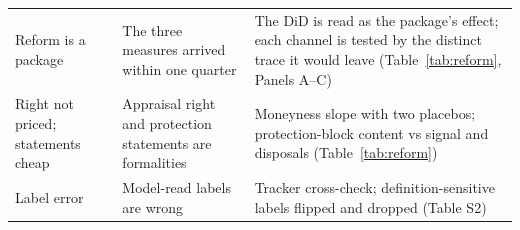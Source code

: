 \begin{table}[htbp]
{\begin{tabular}{>{\raggedright\arraybackslash}p{3.0cm}>{\raggedright\arraybackslash}p{5.4cm}>{\raggedright\arraybackslash}p{6.3cm}}
Reform is a package & The three measures arrived within one quarter & The DiD is read as the package's effect; each channel is tested by the distinct trace it would leave (Table~\ref{tab:reform}, Panels A--C) \\
Right not priced; statements cheap & Appraisal right and protection statements are formalities & Moneyness slope with two placebos; protection-block content vs signal and disposals (Table~\ref{tab:reform}) \\
Label error & Model-read labels are wrong & Tracker cross-check; definition-sensitive labels flipped and dropped (Table S2) \\
\bottomrule
\end{tabular}}
\end{table}
